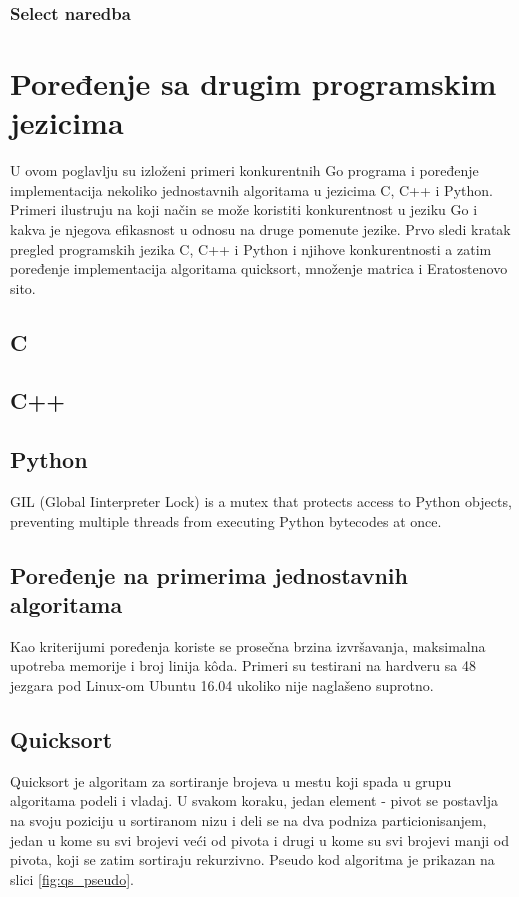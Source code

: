 \documentclass[12pt,oneside]{memoir}
\begin{document}
\subsection{Select naredba}



\chapter {Poređenje sa drugim programskim jezicima}
U ovom poglavlju su izloženi primeri konkurentnih Go programa i poređenje implementacija nekoliko jednostavnih algoritama u jezicima C, C++ i Python. Primeri ilustruju na koji način se može koristiti konkurentnost u jeziku Go i kakva je njegova efikasnost u odnosu na druge pomenute jezike. Prvo sledi kratak pregled programskih jezika C, C++ i Python i njihove konkurentnosti a zatim poređenje implementacija algoritama quicksort, množenje matrica i Eratostenovo sito.

\section{C}

\section{C++}

\section{Python}
\label{gil} GIL (Global Iinterpreter Lock) is a mutex that protects access to Python objects, preventing multiple threads from executing Python bytecodes at once.

\section{Poređenje na primerima jednostavnih algoritama}
Kao kriterijumi poređenja koriste se prosečna brzina izvršavanja, maksimalna upotreba memorije i broj linija k\^{o}da. Primeri su testirani na hardveru sa 48 jezgara pod Linux-om Ubuntu 16.04 ukoliko nije naglašeno suprotno. 



\section{Quicksort}
Quicksort je algoritam za sortiranje brojeva u mestu koji spada u grupu algoritama podeli i vladaj. U svakom koraku, jedan element - pivot se postavlja na svoju poziciju u sortiranom nizu i deli se na dva podniza particionisanjem, jedan u kome su svi brojevi veći od pivota i drugi u kome su svi brojevi manji od pivota, koji se zatim sortiraju rekurzivno.  Pseudo kod algoritma je prikazan na slici \ref{fig:qs_pseudo}. 
\end{document}

